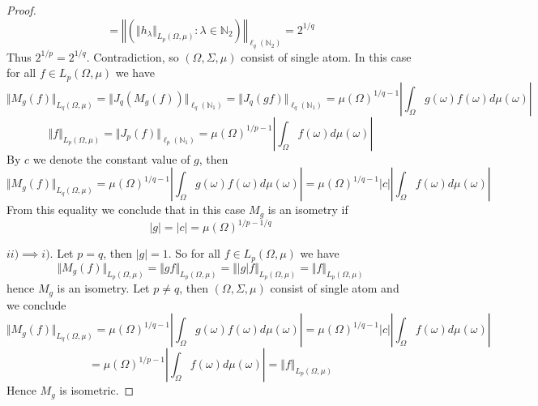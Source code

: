 \begin{proof}
$$=\left\Vert\left(\Vert h_\lambda\Vert_{L_p(\Omega,\mu)}:\lambda\in\mathbb{N}_2\right)\right\Vert_{\ell_q(\mathbb{N}_2)}
=2^{1/q}
$$
Thus $2^{1/p}=2^{1/q}$. Contradiction, so $(\Omega,\Sigma,\mu)$ consist of single atom. In this case for all $f\in L_p(\Omega,\mu)$ we have
$$
\Vert M_g(f)\Vert_{L_q(\Omega,\mu)}
=\Vert J_q(M_g(f))\Vert_{\ell_q(\mathbb{N}_1)}
=\Vert J_q(g  f)\Vert_{\ell_q(\mathbb{N}_1)}
=\mu(\Omega)^{1/q-1}\left|\int_\Omega g(\omega) f(\omega)d\mu(\omega)\right|
$$
$$
\Vert f\Vert_{L_p(\Omega,\mu)}
=\Vert J_p(f)\Vert_{\ell_p(\mathbb{N}_1)}
=\mu(\Omega)^{1/p-1}\left|\int_\Omega f(\omega)d\mu(\omega)\right|
$$
By $c$ we denote the constant value of $g$, then
$$
\Vert M_g(f)\Vert_{L_q(\Omega,\mu)}
=\mu(\Omega)^{1/q-1}\left|\int_\Omega g(\omega) f(\omega)d\mu(\omega)\right|
=\mu(\Omega)^{1/q-1}|c|\left|\int_\Omega f(\omega)d\mu(\omega)\right|
$$
From this equality we conclude that in this case $M_g$ is an isometry if
$$
|g|=|c|=\mu(\Omega)^{1/p-1/q}
$$ 

$ii)$$\implies$$ i)$. Let $p=q$, then $|g|=1$. So for all $f\in L_p(\Omega,\mu)$ we have
$$
\Vert M_g(f)\Vert_{L_p(\Omega,\mu)}
=\Vert g  f\Vert_{L_p(\Omega,\mu)}
=\Vert |g|  f\Vert_{L_p(\Omega,\mu)}
=\Vert f\Vert_{L_p(\Omega,\mu)}
$$
hence $M_g$ is an isometry. Let $p\neq q$, then $(\Omega,\Sigma,\mu)$ consist of single atom and we conclude
$$
\Vert M_g(f)\Vert_{L_q(\Omega,\mu)}
=\mu(\Omega)^{1/q-1}\left|\int_\Omega g(\omega) f(\omega)d\mu(\omega)\right|
=\mu(\Omega)^{1/q-1}|c|\left|\int_\Omega f(\omega)d\mu(\omega)\right|
$$
$$
=\mu(\Omega)^{1/p-1}\left|\int_\Omega f(\omega)d\mu(\omega)\right|
=\Vert f\Vert_{L_p(\Omega,\mu)}
$$
Hence $M_g$ is isometric.
\end{proof}

